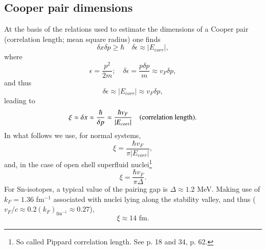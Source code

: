\subsection{Cooper pair dimensions}\label{S3.4.1}
 At the basis of the relations used to estimate  the dimensions of a Cooper pair (correlation length; mean square radius) one finds 
\begin{equation}
\delta x\delta p\ge \hbar\quad \delta\epsilon\approx |E_{corr}|,
\end{equation}
where
\begin{equation}
\epsilon=\frac{p^2}{2m};\quad\delta\epsilon=\frac{p\delta p}{m}\approx v_F\delta p,
\end{equation}
and thus 
\begin{equation}
\delta\epsilon\approx  |E_{corr}|\approx v_F\delta p,
\end{equation}
leading to
\begin{equation}\label{eq3.4.9}
\xi\approx\delta x\approx\frac{\hbar}{\delta p}\approx \frac{\hbar v_F}{ |E_{corr}|}\quad \text{(correlation length)}. \idx{Cooper pair!--mean square radius (correlation length)}
\end{equation}
In what follows we use, for normal systems, 
\begin{equation}
\xi=\frac{\hbar v_F}{ \pi|E_{corr}|},
\end{equation}
and, in the case of open shell superfluid nuclei\footnote{So called Pippard correlation length. See \cite{Schrieffer:64} p. 18 and 34,  \cite{Annett:13} p. 62.}
\begin{equation}\label{eq4.5.11}
\xi=\frac{\hbar v_F}{ \pi\Delta}.
\end{equation}
For Sn-isotopes, a typical value of the pairing gap is $\Delta\approx 1.2$ MeV. Making use of $k_F=1.36$ fm$^{-1}$ associated with nuclei lying along the stability valley, and thus ($v_F/c\approx 0.2 (k_F)_{\text{fm}^{-1}}\approx0.27$),
\begin{equation}
\xi\approx14\text{ fm}.
\end{equation}
